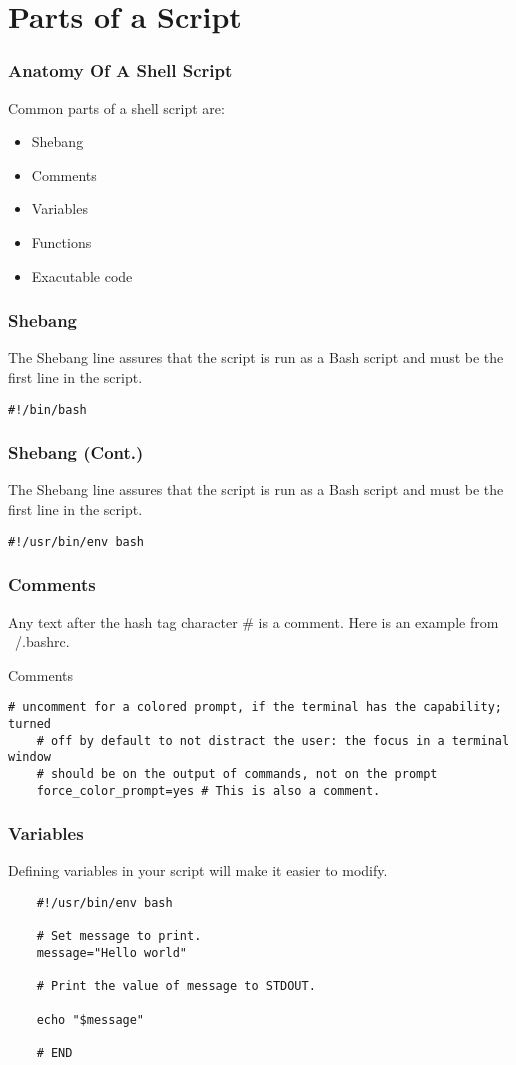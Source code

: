 \documentclass[12pt,handout,aspectratio=169]{beamer}
\begin{document}
\section{Parts of a Script}

\begin{frame}
  \frametitle{Anatomy Of A Shell Script}
  Common parts of a shell script are:
  \begin{itemize}
  \item Shebang
  \item Comments
  \item Variables
  \item Functions
  \item Exacutable code
  \end{itemize}
\end{frame}
\begin{frame}[fragile]
  \frametitle{Shebang}
  The Shebang line assures that the script is run as a Bash script and must be the first line in the script.
\begin{block}{}
\begin{verbatim}
#!/bin/bash
\end{verbatim}
\end{block}
\end{frame}
\begin{frame}[fragile]
  \frametitle{Shebang (Cont.)}
  The Shebang line assures that the script is run as a Bash script and must be the first line in the script.
\begin{block}{}
\begin{verbatim}
#!/usr/bin/env bash
\end{verbatim}
\end{block}
\end{frame}
\begin{frame}[fragile]
  \frametitle{Comments}
  Any text after the hash tag character \# is a comment. Here is an example from ~/.bashrc.
\begin{block}{Comments}
\begin{verbatim}
# uncomment for a colored prompt, if the terminal has the capability; turned
	# off by default to not distract the user: the focus in a terminal window
	# should be on the output of commands, not on the prompt
	force_color_prompt=yes # This is also a comment.
\end{verbatim}
\end{block}
\end{frame}
\begin{frame}[fragile]
  \frametitle{Variables}
  Defining variables in your script will make it easier to modify.
\begin{block}{}
  \begin{verbatim}
	#!/usr/bin/env bash

	# Set message to print.
	message="Hello world"

	# Print the value of message to STDOUT.

	echo "$message"

	# END
  \end{verbatim}
\end{block}
\end{frame}
\end{document}
